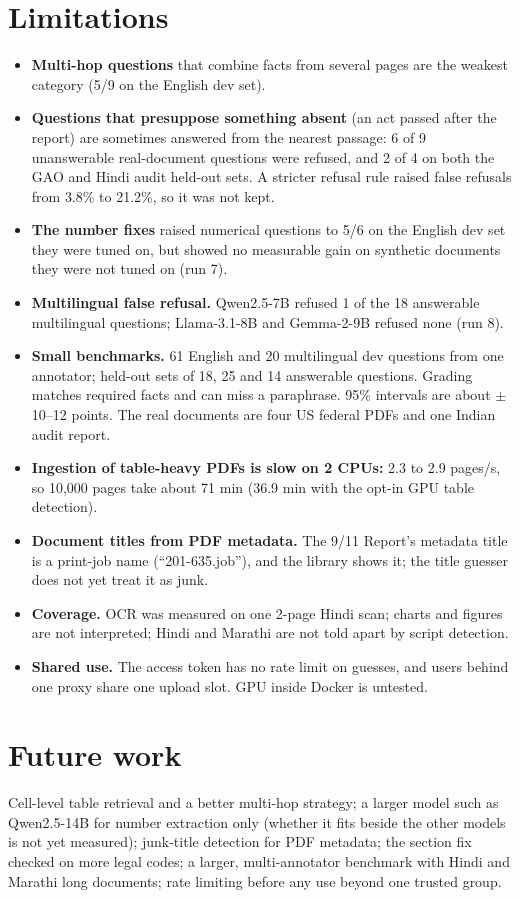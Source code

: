 \documentclass[10pt,a4paper]{article}
\begin{document}
\section{Limitations}
\begin{itemize}
  \item \textbf{Multi-hop questions} that combine facts from several pages are the weakest category (5/9 on the English dev set).
  \item \textbf{Questions that presuppose something absent} (an act passed after the report) are sometimes answered from the nearest passage:
        6 of 9 unanswerable real-document questions were refused, and 2 of 4 on both the GAO and Hindi audit held-out sets. A stricter refusal rule raised false refusals from 3.8\% to 21.2\%, so it was not kept.
  \item \textbf{The number fixes} raised numerical questions to 5/6 on the English dev set they were tuned on, but showed no measurable gain on synthetic documents they were not tuned on (run 7).
  \item \textbf{Multilingual false refusal.} Qwen2.5-7B refused 1 of the 18 answerable multilingual questions; Llama-3.1-8B and Gemma-2-9B refused none (run 8).
  \item \textbf{Small benchmarks.} 61 English and 20 multilingual dev questions from one annotator; held-out sets of 18, 25 and 14 answerable questions. Grading matches required facts and can miss a paraphrase.
        95\% intervals are about $\pm$10--12 points. The real documents are four US federal PDFs and one Indian audit report.
  \item \textbf{Ingestion of table-heavy PDFs is slow on 2 CPUs:} 2.3 to 2.9 pages/s, so 10,000 pages take about 71 min (36.9 min with the opt-in GPU table detection).
  \item \textbf{Document titles from PDF metadata.} The 9/11 Report's metadata title is a print-job name (``201-635.job''), and the library shows it; the title guesser does not yet treat it as junk.
  \item \textbf{Coverage.} OCR was measured on one 2-page Hindi scan; charts and figures are not interpreted; Hindi and Marathi are not told apart by script detection.
  \item \textbf{Shared use.} The access token has no rate limit on guesses, and users behind one proxy share one upload slot. GPU inside Docker is untested.
\end{itemize}

\section{Future work}
Cell-level table retrieval and a better multi-hop strategy; a larger model such as Qwen2.5-14B for number extraction only (whether it fits beside the other models is not yet measured);
junk-title detection for PDF metadata; the section fix checked on more legal codes; a larger, multi-annotator benchmark with Hindi and Marathi long documents; rate limiting before any use
beyond one trusted group.
\end{document}
